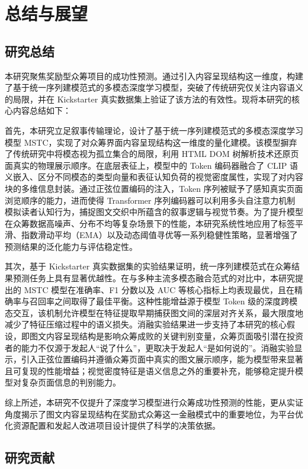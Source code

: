 \newpage
\setcounter{table}{0}
\setcounter{figure}{0}
\section{总结与展望}

\subsection{研究总结}

本研究聚焦奖励型众筹项目的成功性预测。通过引入内容呈现结构这一维度，构建了基于统一序列建模范式的多模态深度学习模型，突破了传统研究仅关注内容语义的局限，并在 Kickstarter 真实数据集上验证了该方法的有效性。现将本研究的核心内容总结如下：

首先，本研究立足叙事传输理论，设计了基于统一序列建模范式的多模态深度学习模型 MSTC，实现了对众筹界面内容呈现结构这一维度的量化建模。该模型摒弃了传统研究中将模态视为孤立集合的局限，利用 HTML DOM 树解析技术还原页面真实的物理展示顺序。在底层表征上，模型中的 Token 编码器融合了 CLIP 语义嵌入、区分不同模态的类型向量和表征认知负荷的视觉密度属性，实现了对内容块的多维信息封装。通过正弦位置编码的注入，Token 序列被赋予了感知真实页面浏览顺序的能力，进而使得 Transformer 序列编码器可以利用多头自注意力机制模拟读者认知行为，捕捉图文交织中所蕴含的叙事逻辑与视觉节奏。为了提升模型在众筹数据高噪声、分布不均等复杂场景下的性能，本研究系统性地应用了标签平滑、指数滑动平均（EMA）以及动态阈值寻优等一系列稳健性策略，显著增强了预测结果的泛化能力与评估稳定性。

其次，基于 Kickstarter 真实数据集的实验结果证明，统一序列建模范式在众筹结果预测任务上具有显著优越性。在与多种主流多模态融合范式的对比中，本研究提出的 MSTC 模型在准确率、F1 分数以及 AUC 等核心指标上均表现最优，且在精确率与召回率之间取得了最佳平衡。这种性能增益源于模型 Token 级的深度跨模态交互，该机制允许模型在特征提取早期捕获图文间的深层对齐关系，最大限度地减少了特征压缩过程中的语义损失。消融实验结果进一步支持了本研究的核心假设，即图文内容呈现结构是影响众筹成败的关键判别变量，众筹页面吸引潜在投资者的能力不仅源于发起人``说了什么''，更取决于发起人``是如何说的''。消融实验显示，引入正弦位置编码并遵循众筹页面中真实的图文展示顺序，能为模型带来显著且可复现的性能增益；视觉密度特征是语义信息之外的重要补充，能够稳定提升模型对复杂页面信息的判别能力。

综上所述，本研究不仅提升了深度学习模型进行众筹成功性预测的性能，更从实证角度揭示了图文内容呈现结构在奖励式众筹这一金融模式中的重要地位，为平台优化资源配置和发起人改进项目设计提供了科学的决策依据。

\subsection{研究贡献}

